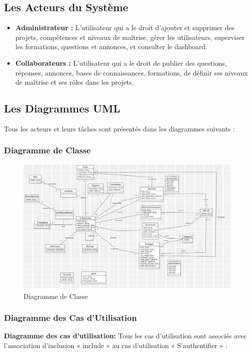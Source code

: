 \documentclass{article}
\begin{document}
        \subsection{Les Acteurs du Système}  
            \begin{itemize}
                \item \textbf{Administrateur :} L'utilisateur qui a le droit d'ajouter et supprimer des projets, compétences et niveaux de maîtrise, gérer les utilisateurs, superviser les formations, questions et annonces, et consulter le dashboard.
                \item \textbf{Collaborateurs :} L'utilisateur qui a le droit de publier des questions, réponses, annonces, bases de connaissances, formations, de définir ses niveaux de maîtrise et ses rôles dans les projets.
            \end{itemize}
        \subsection{Les Diagrammes UML}
            Tous les acteurs et leurs tâches sont présentés dans les diagrammes suivants :
            
            \subsubsection{Diagramme de Classe}
                \begin{figure}[h!]
                    \centering
                    \includegraphics[width=1.0\textwidth]{assets/diagrammes/class.jpg}
                    \caption{Diagramme de Classe}
                \end{figure}
                \FloatBarrier 
            \newpage
            \subsubsection{Diagramme des Cas d'Utilisation}
                \textbf{Diagramme des cas d'utilisation:} Tous les cas d'utilisation sont associés avec l'association d'inclusion « include » au cas d'utilisation « S'authentifier » :
                
\end{document}
